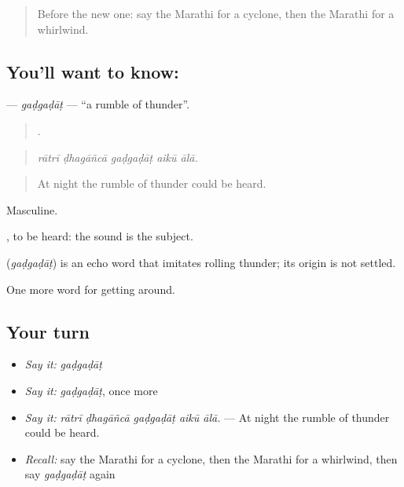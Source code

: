 \label{lesson:MR-C439-gadgadat}



\begin{quote}
Before the new one: say the Marathi for a cyclone, then the Marathi for a whirlwind.
\end{quote}

\subsection*{You'll want to know: }
\textbf{} — \emph{gaḍgaḍāṭ} — \textquotedblleft{}a rumble of thunder\textquotedblright{}.

\begin{quote}
    .
\end{quote}

\begin{quote}
\emph{rātrī ḍhagāñcā gaḍgaḍāṭ aikū ālā.}
\end{quote}

\begin{quote}
At night the rumble of thunder could be heard.
\end{quote}

Masculine.

 , to be heard: the sound is the subject.

\begin{cousinweb}
\textbf{} (\emph{gaḍgaḍāṭ}) is an echo word that imitates rolling thunder; its origin is not settled.
\end{cousinweb}

\begin{grammarlens}[title={What you've built}]
One more word for getting around.
\end{grammarlens}

\subsection*{Your turn}
\begin{itemize}
\raggedright
  \item \emph{Say it:} \emph{gaḍgaḍāṭ}
  \item \emph{Say it:} \emph{gaḍgaḍāṭ}, once more
  \item \emph{Say it:} \emph{rātrī ḍhagāñcā gaḍgaḍāṭ aikū ālā.} — At night the rumble of thunder could be heard.
  \item \emph{Recall:} say the Marathi for a cyclone, then the Marathi for a whirlwind, then say \emph{gaḍgaḍāṭ} again
\end{itemize}

